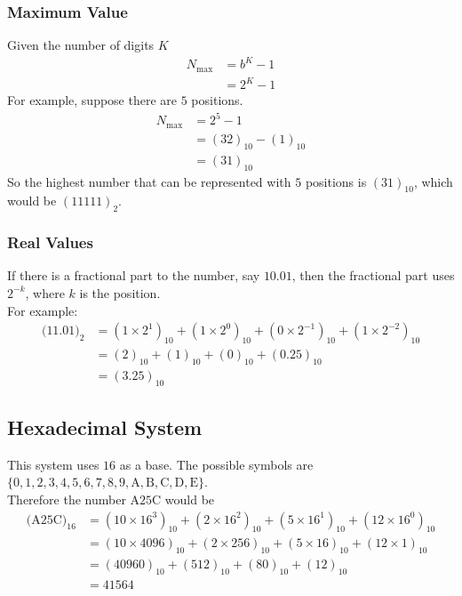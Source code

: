 \documentclass[../notes.tex]{subfiles}
\begin{document}
				\subsubsection{Maximum Value}
					Given the number of digits $K$
					\begin{align*}
						N_{\max} &= b^{K} - 1\\
						&= 2^{K} - 1
					\end{align*}
					For example, suppose there are $5$ positions.
					\begin{align*}
						N_{\max} &= 2^{5} - 1\\
						&= (32)_{10} - (1)_{10}\\
						&= (31)_{10}
					\end{align*}
					So the highest number that can be represented with $5$ positions is $(31)_{10}$, which would be $(11111)_{2}$.
				\subsubsection{Real Values}
					If there is a fractional part to the number, say $10.01$, then the fractional part uses $2^{-k}$, where $k$ is the position.\\
					For example:
					\begin{align*}
						\bigl(11.01\bigr)_{2} &= \left(1 \times 2^{1}\right)_{10} + \left(1 \times 2^{0}\right)_{10} + \left(0 \times 2^{-1}\right)_{10} + \left(1 \times 2^{-2}\right)_{10}\\
						&= (2)_{10} + (1)_{10} + (0)_{10} + (0.25)_{10}\\
						&= (3.25)_{10}
					\end{align*}
			\pagebreak
			\subsection{Hexadecimal System}
				This system uses $16$ as a base. The possible symbols are $\{0, 1, 2, 3, 4, 5, 6, 7, 8, 9, \mathrm{A}, \mathrm{B}, \mathrm{C}, \mathrm{D}, \mathrm{E}\}$.\\
				Therefore the number $\mathrm{A}25\mathrm{C}$ would be
				\begin{align*}
					\bigl(\mathrm{A}25\mathrm{C}\bigr)_{16} &= \left(10 \times 16^{3}\right)_{10} + \left(2 \times 16^{2}\right)_{10} + \left(5 \times 16^{1}\right)_{10} + \left(12 \times 16^{0}\right)_{10}\\
					&= (10 \times 4096)_{10} + (2 \times 256)_{10} + (5 \times 16)_{10} + (12 \times 1)_{10}\\
					&= (40960)_{10} + (512)_{10} + (80)_{10} + (12)_{10}\\
					&= 41564
				\end{align*}
\end{document}
